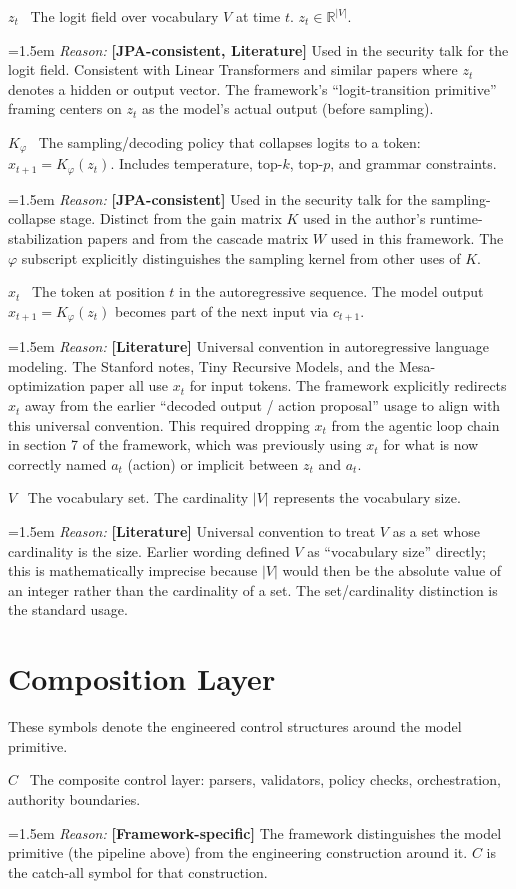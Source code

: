 \documentclass[11pt]{article}
\newcommand{\notation}[2]{%
  \par\smallskip
  \noindent\textbf{#1} \, #2\par
}
\newcommand{\reason}[2]{%
  \par\nopagebreak
  \begingroup
    \leftskip=1.5em
    \sloppy
    \noindent\textit{Reason:} \textbf{[#1]} #2\par
  \endgroup
  \par\smallskip
}
\begin{document}
\notation{$z_t$}{The logit field over vocabulary $V$ at time $t$. $z_t \in \mathbb{R}^{|V|}$.}
\reason{JPA-consistent, Literature}{Used in the security talk for the logit field. Consistent with Linear Transformers and similar papers where $z_t$ denotes a hidden or output vector. The framework's ``logit-transition primitive'' framing centers on $z_t$ as the model's actual output (before sampling).}

\notation{$K_\varphi$}{The sampling/decoding policy that collapses logits to a token: $x_{t+1} = K_\varphi(z_t)$. Includes temperature, top-$k$, top-$p$, and grammar constraints.}
\reason{JPA-consistent}{Used in the security talk for the sampling-collapse stage. Distinct from the gain matrix $K$ used in the author's runtime-stabilization papers and from the cascade matrix $W$ used in this framework. The $\varphi$ subscript explicitly distinguishes the sampling kernel from other uses of $K$.}

\notation{$x_t$}{The token at position $t$ in the autoregressive sequence. The model output $x_{t+1} = K_\varphi(z_t)$ becomes part of the next input via $c_{t+1}$.}
\reason{Literature}{Universal convention in autoregressive language modeling. The Stanford notes, Tiny Recursive Models, and the Mesa-optimization paper all use $x_t$ for input tokens. The framework explicitly redirects $x_t$ away from the earlier ``decoded output / action proposal'' usage to align with this universal convention. This required dropping $x_t$ from the agentic loop chain in section 7 of the framework, which was previously using $x_t$ for what is now correctly named $a_t$ (action) or implicit between $z_t$ and $a_t$.}

\notation{$V$}{The vocabulary set. The cardinality $|V|$ represents the vocabulary size.}
\reason{Literature}{Universal convention to treat $V$ as a set whose cardinality is the size. Earlier wording defined $V$ as ``vocabulary size'' directly; this is mathematically imprecise because $|V|$ would then be the absolute value of an integer rather than the cardinality of a set. The set/cardinality distinction is the standard usage.}

\section{Composition Layer}

These symbols denote the engineered control structures around the model primitive.

\notation{$C$}{The composite control layer: parsers, validators, policy checks, orchestration, authority boundaries.}
\reason{Framework-specific}{The framework distinguishes the model primitive (the pipeline above) from the engineering construction around it. $C$ is the catch-all symbol for that construction.}
\end{document}
